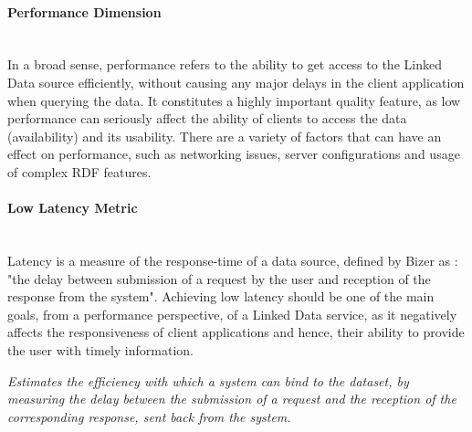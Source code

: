\paragraph{Performance Dimension}~\\ %
In a broad sense, performance refers to the ability to get access to the Linked Data source efficiently, without causing any major delays in the client application when querying the data. It constitutes a highly important quality feature, as low performance can seriously affect the ability of clients to access the data (availability) and its usability. There are a variety of factors that can have an effect on performance, such as networking issues, server configurations and usage of complex RDF features.

\paragraph{Low Latency Metric} ~\\ %
Latency is a measure of the response-time of a data source, defined by Bizer as \cite{Bizer2007}: "the delay between submission of a request by the user and reception of the response from the system". Achieving low latency should be one of the main goals, from a performance perspective, of a Linked Data service, as it negatively affects the responsiveness of client applications and hence, their ability to provide the user with timely information.
\begin{mdframed}[style=metricdefinition]
\emph{Estimates the efficiency with which a system can bind to the dataset, by measuring the delay between the submission of a request  and the reception of the corresponding response, sent back from the system.}
\end{mdframed}

